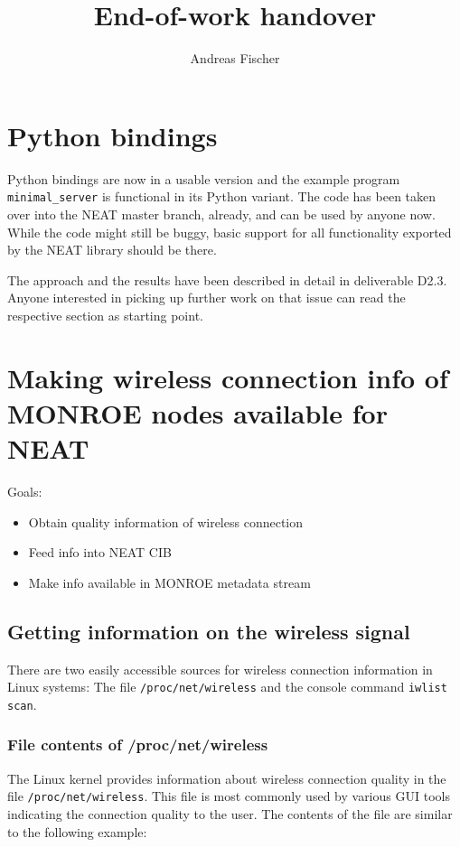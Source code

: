 \documentclass{scrartcl}
\begin{document}
\title{End-of-work handover}
\author{Andreas Fischer}
\maketitle

\section*{Python bindings}

Python bindings are now in a usable version and the example program
\verb#minimal_server# is functional in its Python variant. The code
has been taken over into the NEAT master branch, already, and can
be used by anyone now. While the code might still be buggy, basic
support for all functionality exported by the NEAT library should be
there.

The approach and the results have been described in detail in
deliverable D2.3. Anyone interested in picking up further work on that
issue can read the respective section as starting point.

\section*{Making wireless connection info of MONROE nodes available for NEAT}

Goals:

\begin{itemize}
	\item Obtain quality information of wireless connection
	\item Feed info into NEAT CIB
	\item Make info available in MONROE metadata stream
\end{itemize}

\subsection*{Getting information on the wireless signal}

There are two easily accessible sources for wireless connection information
in Linux systems: The file \verb#/proc/net/wireless# and the console command
\verb#iwlist scan#.

\subsubsection*{File contents of /proc/net/wireless}

The Linux kernel provides information about wireless connection quality in
the file \verb#/proc/net/wireless#. This file is most commonly used by various
GUI tools indicating the connection quality to the user. The contents of the
file are similar to the following example:
\end{document}
